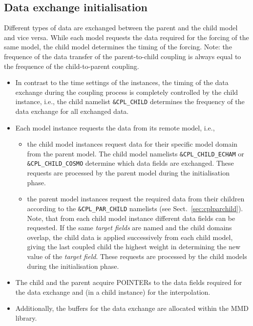 \documentclass[11pt,twoside]{article}
\begin{document}
\subsection{\bf Data exchange initialisation}
Different types of data are exchanged between the parent and the child model
and vice versa. While each model requests the data required for the forcing of
the same model, the child model determines the timing of the forcing. Note:
the frequence of the data transfer of the parent-to-child coupling is always 
equal to the frequence of the child-to-parent coupling.
\begin{itemize}
\item  In contrast to the time settings of the instances, the timing
of the data exchange during the coupling process is completely
controlled by the child instance, i.e.,
 the child namelist \verb|&CPL_CHILD| determines the frequency of the data 
exchange for all exchanged data.

\item Each model instance requests the data from its remote model, i.e.,
\begin{itemize}
\item  the child model instances request data for their specific model
domain from the parent model. The child model namelists \verb|&CPL_CHILD_ECHAM|
or \verb|&CPL_CHILD_COSMO| determine  which data fields are exchanged. 
These requests are processed by the parent model during the initialisation phase. 
\item the parent model instances request the required data from their
children according to the \verb|&CPL_PAR_CHILD| namelists (see
Sect.\ \ref{sec:cplparchild}). 
Note, that from each child model instance different data fields can be
requested. If the same {\it target fields} are named and the child domains
overlap, the child data is applied successively from each child model,
giving the last coupled child the highest weight in determining the new value of
the {\it target field}.
These requests are processed by the child models during the initialisation
phase. 
\end{itemize}

\item The child and the parent acquire {\footnotesize POINTER}s to the
data  fields required for the data exchange and (in a child instance) for
the interpolation. 
\item Additionally, the buffers for the data exchange are allocated within the
MMD library. 
\end{itemize}
\end{document}
